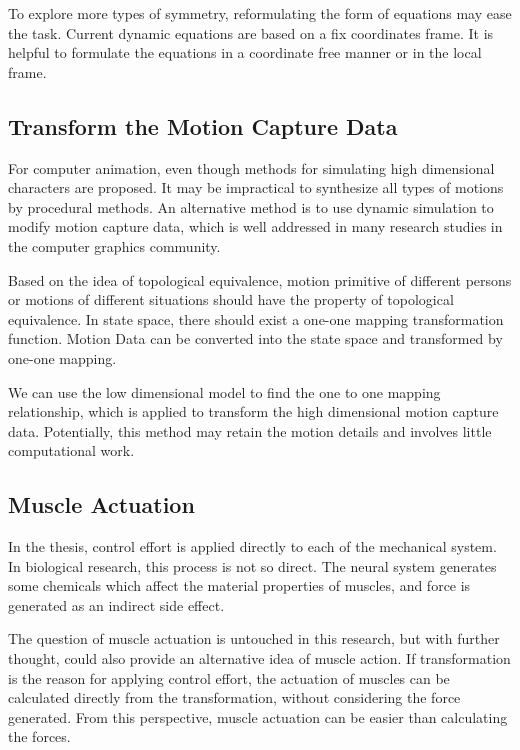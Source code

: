To explore more types of symmetry, reformulating the form of equations may ease the task.
Current dynamic equations are based on a fix coordinates frame.
It is helpful to formulate the equations in a coordinate free manner or in the local frame.






\subsection{Transform the Motion Capture Data}
For computer animation, even though methods for simulating high dimensional characters are proposed.
It may be impractical to synthesize all types of motions by procedural methods.
An alternative method is to use dynamic simulation to modify motion capture data, which is well addressed in many research studies in the computer  graphics community.



Based on the idea of topological equivalence, 
motion primitive of different persons or motions of different situations should have the property of topological equivalence.
In state space, there should exist a one-one mapping transformation function.
Motion Data can be converted into the state space and  transformed by one-one mapping.


We can use the low dimensional model to find the one to one mapping relationship, 
which is applied to transform the high dimensional motion capture data.
Potentially, this method may retain the motion details and involves little computational work. 





\subsection{Muscle Actuation}
In the thesis, control effort is applied directly to each \dof of the mechanical system.
In biological research, this process is not so direct.
The neural system generates some chemicals which affect the material properties of muscles, and force is generated as an indirect side effect.


The question of muscle actuation is untouched in this research,
but with further thought, \moit could also provide an alternative idea of muscle action.
If transformation is the reason for applying control effort, the actuation of muscles can be calculated directly from the transformation, without considering the force generated.
From this perspective, muscle actuation can be easier than calculating the forces.



